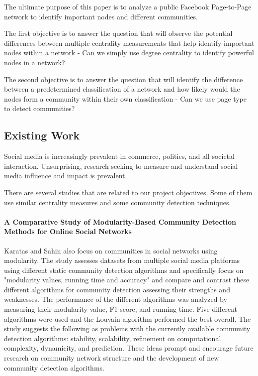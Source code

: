 \documentclass[11pt,twocolumn]{article}
\begin{document}
The ultimate purpose of this paper is to analyze a public Facebook Page-to-Page network to identify important nodes and different communities. 

The first objective is to answer the question that will observe the potential differences between multiple centrality measurements that help identify important nodes within a network - Can we simply use degree centrality to identify powerful nodes in a network?


The second objective is to answer the question that will identify the difference between a predetermined classification of a network and how likely would the nodes form a community within their own classification - Can we use page type to detect communities?


\subsection{Existing Work}

Social media is increasingly prevalent in commerce, politics, and all societal interaction. Unsurprising, research seeking to measure and understand social media influence and impact is prevalent. 

There are several studies that are related to our project objectives. Some of them use similar centrality measures and some community detection techniques. 

\paragraph{A Comparative Study of Modularity-Based Community Detection Methods for Online Social Networks \cite{modularity-based-community}}   
 
Karatas and Sahin also focus on communities in social networks using modularity. The study assesses datasets from multiple social media platforms using different static community detection algorithms and specifically focus on "modularity values, running time and accuracy" and compare and contrast these different algorithms for community detection assessing their strengths and weaknesses. The performance of the different algorithms was analyzed by measuring their modularity value, F1-score, and running time. Five different algorithms were used and the Louvain algorithm performed the best overall. The study suggests the following as problems with the currently available community detection algorithms: stability, scalability, refinement on computational complexity, dynamicity, and prediction. These ideas prompt and encourage future research on community network structure and the development of new community detection algorithms.
\end{document}
